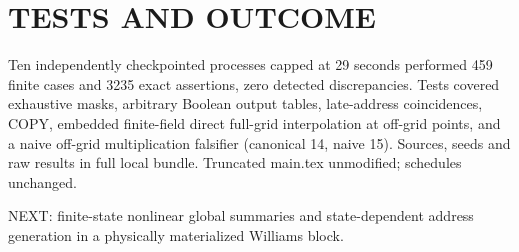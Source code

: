 \documentclass{article}
\begin{document}
\section{TESTS AND OUTCOME}
Ten independently checkpointed processes capped at 29 seconds performed 459 finite cases and 3235 exact assertions, zero detected discrepancies. Tests covered exhaustive masks, arbitrary Boolean output tables, late-address coincidences, COPY, embedded finite-field direct full-grid interpolation at off-grid points, and a naive off-grid multiplication falsifier (canonical 14, naive 15). Sources, seeds and raw results in full local bundle. Truncated main.tex unmodified; schedules unchanged.
\par\noindent NEXT: finite-state nonlinear global summaries and state-dependent address generation in a physically materialized Williams block.
\end{document}
